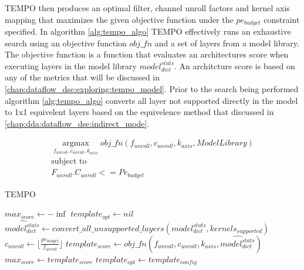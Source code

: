 TEMPO then produces an optimal filter, channel unroll factors and kernel axis
mapping that maximizes the given objective function under the $pe_{budget}$
constraint specified. 
In algorithm \ref{alg:tempo_algo} TEMPO effectively runs an exhaustive search
using an objective function $obj\_fn$ and a set of layers from a model library.
The objective function is a function that evaluates an architectures score when
executing layers in the model library $model^{stats}_{dict}$. An architcture
score is based on any of the metrics that will be discussed in
\autoref{chap:dataflow_dse:exploring:tempo_model}. Prior to the search being
performed algorithm \ref{alg:tempo_algo} converts all layer not supported
directly in the model to 1x1 equivelent layers based on the equivelence method
that discussed in \autoref{chap:dda:dataflow_dse:indirect_mode}.

\begin{equation}
    \begin{aligned}
        \operatorname*{argmax}_{f_{unroll}, c_{unroll}, k_{axis}} obj\_fn(f_{unroll}, c_{unroll}, k_{axis}, ModelLibrary) \\
        \text{subject to} \\
        F_{unroll}. C_{unroll} <= Pe_{budget}
    \end{aligned}
    \label{math:tempo_algo_tldr}
\end{equation}

\begin{algorithm}[H] 
    \caption{\ac{TEMPO}}
    \label{alg:tempo_algo}
    \begin{algorithmic}[1]
    \Statex
        \State $max_{score} \gets -\inf$
        \State $template_{opt} \gets nil$
        \State $\hat{model^{stats}_{dict}} \gets convert\_all\_unsupported\_layers(model^{stats}_{dict}, kernels_{supported})$
                \State $c_{unroll} \gets \lfloor \frac{pe_{budget}}{f_{unroll}} \rfloor$ 
                \State $template_{score} \gets obj\_fn(f_{unroll}, c_{unroll}, k_{axis}, \hat{model^{stats}_{dict}})$
                    \State $max_{score} \gets template_{score}$
                    \State $template_{opt} \gets template_{config}$
                \EndIf
            \EndFor
        \EndFor
        \State {}
    \EndFunction
    \end{algorithmic}
\end{algorithm}

